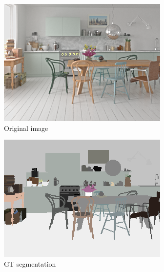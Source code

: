 \begin{figure}[H]
  \centering
  \begin{subfigure}{0.32\linewidth}
    \includegraphics[width=\linewidth]{praca/images/AI43_001_Cam01.png}
    \caption{Original image}
  \end{subfigure}
  \begin{subfigure}{0.32\linewidth}
    \includegraphics[width=\linewidth]{praca/images/AI43_001_Cam01.VRayMtlID.png}
    \caption{GT segmentation}
  \end{subfigure}
  \begin{subfigure}{0.32\linewidth}

\end{subfigure}
\end{figure}

